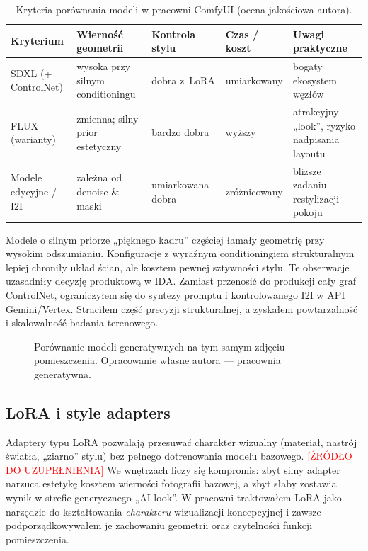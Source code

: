 \begin{table}[htbp]
  \centering
  \caption{Kryteria porównania modeli w pracowni ComfyUI (ocena jakościowa autora).}
  \label{tab:ch04:modele}
  \begin{tabular}{@{}p{2.4cm}p{2.6cm}p{2.6cm}p{2.4cm}p{2.6cm}@{}}
    \toprule
    Kryterium & Wierność geometrii & Kontrola stylu & Czas / koszt & Uwagi praktyczne \\
    \midrule
    SDXL (+ ControlNet) & wysoka przy silnym conditioningu & dobra z~LoRA & umiarkowany & bogaty ekosystem węzłów \\
    FLUX (warianty) & zmienna; silny prior estetyczny & bardzo dobra & wyższy & atrakcyjny „look”, ryzyko nadpisania layoutu \\
    Modele edycyjne / I2I & zależna od denoise \& maski & umiarkowana--dobra & zróżnicowany & bliższe zadaniu restylizacji pokoju \\
    \bottomrule
  \end{tabular}
\end{table}

Modele o silnym priorze „pięknego kadru” częściej łamały geometrię przy wysokim odszumianiu. Konfiguracje z wyraźnym conditioningiem strukturalnym lepiej chroniły układ ścian, ale kosztem pewnej sztywności stylu.
Te obserwacje uzasadniły decyzję produktową w IDA. Zamiast przenosić do produkcji cały graf ControlNet, ograniczyłem się do syntezy promptu i kontrolowanego I2I w API Gemini/Vertex. Straciłem część precyzji strukturalnej, a zyskałem powtarzalność i skalowalność badania terenowego.

\begin{figure}[htbp]
  \centering
  \caption{Porównanie modeli generatywnych na tym samym zdjęciu pomieszczenia.
  Opracowanie własne autora --- pracownia generatywna.}
  \label{fig:ch04:model-comparison}
\end{figure}

\subsection{LoRA i style adapters}
\label{ch04:sec:lora}

Adaptery typu LoRA pozwalają przesuwać charakter wizualny (materiał, nastrój światła, „ziarno” stylu) bez pełnego dotrenowania modelu bazowego. \textcolor{red}{[ŹRÓDŁO DO UZUPEŁNIENIA]}
We wnętrzach liczy się kompromis: zbyt silny adapter narzuca estetykę kosztem wierności fotografii bazowej, a zbyt słaby zostawia wynik w strefie generycznego „AI look”.
W pracowni traktowałem LoRA jako narzędzie do kształtowania \emph{charakteru} wizualizacji koncepcyjnej i zawsze podporządkowywałem je zachowaniu geometrii oraz czytelności funkcji pomieszczenia.

